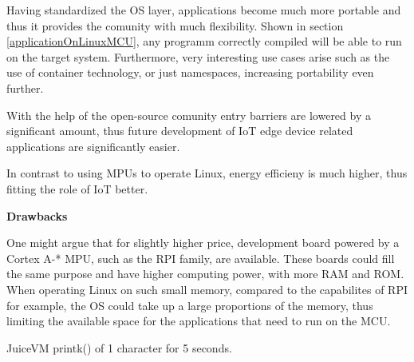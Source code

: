 Having standardized the OS layer, applications become much more portable and thus it provides the comunity with much flexibility. Shown in section \ref{applicationOnLinuxMCU}, any programm correctly compiled will be able to run on the target system. Furthermore, very interesting use cases arise such as the use of container technology, or just namespaces, increasing portability even further.

With the help of the open-source comunity entry barriers are lowered by a significant amount, thus future development of IoT edge device related applications are significantly easier.

In contrast to using MPUs to operate Linux, energy efficieny is much higher, thus fitting the role of IoT better. 



\textbf{Drawbacks}

One might argue that for slightly higher price, development board powered by a Cortex A-* MPU, such as the RPI family, are available. These boards could fill the same purpose and have higher computing power, with more RAM and ROM. When operating Linux on such small memory, compared to the capabilites of RPI for example, the OS could take up a large proportions of the memory, thus limiting the available space for the applications that need to run on the MCU.



JuiceVM printk() of 1 character for 5 seconds.